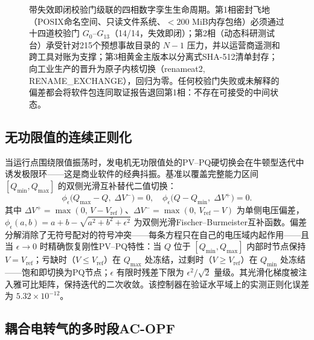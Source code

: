 \begin{figure}[!t]
\centering
\resizebox{0.88\textwidth}{!}{}
\caption{带失效即闭校验门级联的四相数字孪生生命周期。第1相密封飞地（POSIX命名空间、只读文件系统、${<}200$ MiB内存包络）必须通过十四道校验门 $G_0$--$G_{13}$（14/14，失效即闭）；第2相（动态科研测试台）承受针对215个预想事故目录的 $N-1$ 压力，并以运营商遥测和跨工具对账为支撑；第3相黄金主版本以分离式SHA-512清单封存；向工业生产的晋升为原子内核切换（renameat2, RENAME\_EXCHANGE），回归为零。任何校验门失败或未解释的偏差都会将软件包连同取证报告退回第1相：不存在可接受的中间状态。}
\label{fig:gemelo_fases}
\end{figure}

\subsection{无功限值的连续正则化}
\label{sub:regularization}

当运行点围绕限值振荡时，发电机无功限值处的PV--PQ硬切换会在牛顿型迭代中诱发极限环——这是商业软件的经典抖振。基准以覆盖完整能力区间 $[Q_{\min}, Q_{\max}]$ 的双侧光滑互补替代二值切换：
\begin{equation}
\phi_\epsilon\bigl(Q_{\max} - Q,\; \Delta V^{-}\bigr) = 0, \quad
\phi_\epsilon\bigl(Q - Q_{\min},\; \Delta V^{+}\bigr) = 0.
\label{eq:qbound}
\end{equation}
其中 $\Delta V^{+} = \max(0,\, V - V_{\mathrm{ref}})$、$\Delta V^{-} = \max(0,\, V_{\mathrm{ref}} - V)$ 为单侧电压偏差，$\phi_\epsilon(a, b) = a + b - \sqrt{a^2 + b^2 + \epsilon^2}$ 为双侧光滑Fischer--Burmeister互补函数。偏差分解消除了无符号配对的符号冲突——每条方程只在自己的电压域内起作用——且当 $\epsilon \to 0$ 时精确恢复刚性PV--PQ特性：当 $Q$ 位于 $[Q_{\min}, Q_{\max}]$ 内部时节点保持 $V = V_{\mathrm{ref}}$；亏缺时（$V \le V_{\mathrm{ref}}$）在 $Q_{\max}$ 处冻结，过剩时（$V \ge V_{\mathrm{ref}}$）在 $Q_{\min}$ 处冻结——饱和即切换为PQ节点；$\epsilon$ 有限时残差下限为 $\epsilon^2/\sqrt{2}$ 量级。其光滑化梯度被注入雅可比矩阵，保持迭代的二次收敛。该控制器在验证水平域上的实测正则化误差为 $5.32 \times 10^{-12}$。

\subsection{耦合电转气的多时段AC-OPF}
\label{sub:opf}

